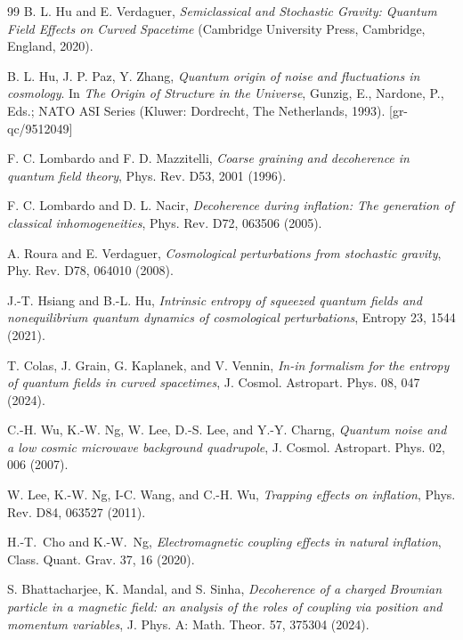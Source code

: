 \documentclass[%
amssymb,preprint,preprintnumbers,nofootinbib,superscriptaddress]{revtex4}
\begin{document}
\begin{thebibliography}{99}
B. L. Hu and E. Verdaguer, \textit{Semiclassical and Stochastic Gravity: Quantum Field Effects on Curved Spacetime}
(Cambridge University Press, Cambridge, England, 2020).  

B. L. Hu, J. P. Paz, Y. Zhang,  \textit{Quantum origin of noise and fluctuations in cosmology}. In \textit{The Origin of Structure in the Universe},   Gunzig, E., Nardone, P., Eds.; NATO ASI Series (Kluwer: Dordrecht, The Netherlands, 1993). [gr-qc/9512049]

F. C. Lombardo and F. D. Mazzitelli, \textit{Coarse graining and decoherence in quantum field theory}, Phys. Rev. D53, 2001 (1996). 

F. C. Lombardo and D. L. Nacir, \textit{Decoherence during inflation: The generation of classical inhomogeneities}, Phys. Rev. D72, 063506 (2005).

A. Roura and E. Verdaguer, \textit{Cosmological perturbations from stochastic gravity}, Phy. Rev. D78, 064010 (2008).

J.-T. Hsiang and B.-L. Hu, \textit{Intrinsic entropy of squeezed
quantum fields and nonequilibrium
quantum dynamics of cosmological
perturbations}, Entropy 23, 1544 (2021).


T. Colas, J. Grain, G. Kaplanek, and V. Vennin, \textit{In-in formalism for the entropy of quantum fields in curved spacetimes}, J. Cosmol. Astropart. Phys. 08, 047 (2024).

C.-H. Wu, K.-W. Ng, W. Lee, D.-S. Lee, and Y.-Y. Charng, \textit{Quantum noise and a low cosmic microwave background quadrupole}, J. Cosmol. Astropart. Phys. 02, 006 (2007).

W. Lee, K.-W. Ng, I-C. Wang, and C.-H. Wu, \textit{Trapping effects on inflation}, Phys. Rev. D84, 063527 (2011).

H.-T.~Cho and K.-W.~Ng, \textit{Electromagnetic coupling effects in natural inflation}, Class. Quant. Grav. 37, 16 (2020).



S. Bhattacharjee, K. Mandal,
and S. Sinha, \textit{Decoherence of a charged Brownian
particle in a magnetic field: an analysis
of the roles of coupling via position and
momentum variables}, J. Phys. A: Math. Theor. 57, 375304 (2024).  %


\end{thebibliography}
\end{document}
